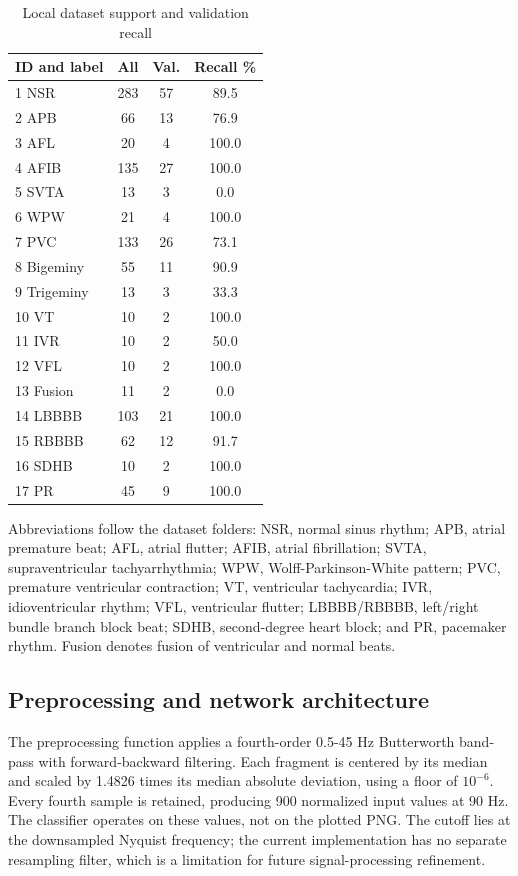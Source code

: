 \documentclass{jpp}
\begin{document}
\begin{table}
\centering
\caption{Local dataset support and validation recall}\label{tab:support}
\small
\begin{tabular}{lccc}
\hline
ID and label & All & Val. & Recall \% \\
\hline
1 NSR & 283 & 57 & 89.5 \\
2 APB & 66 & 13 & 76.9 \\
3 AFL & 20 & 4 & 100.0 \\
4 AFIB & 135 & 27 & 100.0 \\
5 SVTA & 13 & 3 & 0.0 \\
6 WPW & 21 & 4 & 100.0 \\
7 PVC & 133 & 26 & 73.1 \\
8 Bigeminy & 55 & 11 & 90.9 \\
9 Trigeminy & 13 & 3 & 33.3 \\
10 VT & 10 & 2 & 100.0 \\
11 IVR & 10 & 2 & 50.0 \\
12 VFL & 10 & 2 & 100.0 \\
13 Fusion & 11 & 2 & 0.0 \\
14 LBBBB & 103 & 21 & 100.0 \\
15 RBBBB & 62 & 12 & 91.7 \\
16 SDHB & 10 & 2 & 100.0 \\
17 PR & 45 & 9 & 100.0 \\
\hline
\end{tabular}
\end{table}

Abbreviations follow the dataset folders: NSR, normal sinus rhythm; APB, atrial premature beat; AFL, atrial flutter; AFIB, atrial fibrillation; SVTA, supraventricular tachyarrhythmia; WPW, Wolff-Parkinson-White pattern; PVC, premature ventricular contraction; VT, ventricular tachycardia; IVR, idioventricular rhythm; VFL, ventricular flutter; LBBBB/RBBBB, left/right bundle branch block beat; SDHB, second-degree heart block; and PR, pacemaker rhythm. Fusion denotes fusion of ventricular and normal beats.

\subsection{Preprocessing and network architecture}

The preprocessing function applies a fourth-order 0.5-45 Hz Butterworth band-pass with forward-backward filtering. Each fragment is centered by its median and scaled by 1.4826 times its median absolute deviation, using a floor of $10^{-6}$. Every fourth sample is retained, producing 900 normalized input values at 90 Hz. The classifier operates on these values, not on the plotted PNG. The cutoff lies at the downsampled Nyquist frequency; the current implementation has no separate resampling filter, which is a limitation for future signal-processing refinement.
\end{document}
